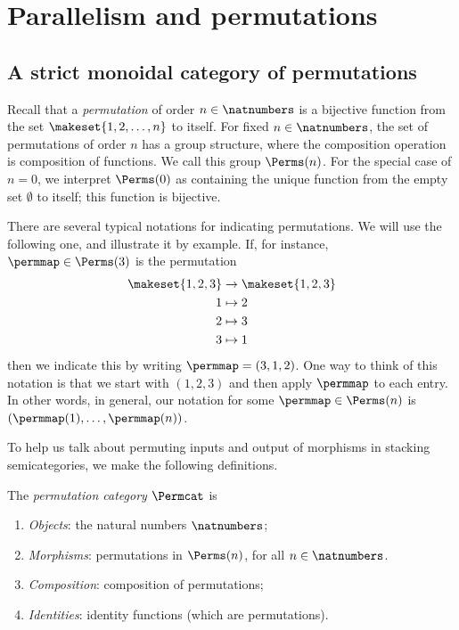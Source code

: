 
\section{Parallelism and permutations}
\label{sec:parallelism-and-permutations}


\subsection{A strict monoidal category of permutations}

Recall that a \emph{permutation} of order $n \in \natnumbers$ is a bijective function from the set $\makeset{1,2, \dots , n}$ to itself.
For fixed $n \in \natnumbers$, the set of permutations of order $n$ has a group structure, where the composition operation is composition of functions.
We call this group $\Perms(n)$.
For the special case of $n = 0$, we interpret $\Perms(0)$ as containing the unique function from the empty set $\emptyset$ to itself; this function is bijective.

There are several typical notations for indicating permutations.
We will use the following one, and illustrate it by example.
If, for instance, $\permmap \in \Perms(3)$ is the permutation
\begin{align*}
    \makeset{1,2,3} & \to \makeset{1,2,3} \\
    1               & \mapsto 2 \\
    2               & \mapsto 3 \\
    3               & \mapsto 1
\end{align*}
then we indicate this by writing $\permmap = (3, 1, 2)$.
One way to think of this notation is that we start with $(1, 2, 3)$ and then apply $\permmap$ to each entry.
In other words, in general, our notation for some $\permmap \in \Perms(n)$ is $(\permmap(1), \dots, \permmap(n))$.

To help us talk about permuting inputs and output of morphisms in stacking semicategories, we make the following definitions.

\begin{definition}
    The \emph{permutation category} $\Permcat$ is
    \begin{enumerate}
        \item \emph{Objects}: the natural numbers $\natnumbers$;
        \item \emph{Morphisms}: permutations in $\Perms(n)$, for all $n \in \natnumbers$.
        \item \emph{Composition}: composition of permutations;
        \item \emph{Identities}: identity functions (which are permutations).
    \end{enumerate}
\end{definition}

